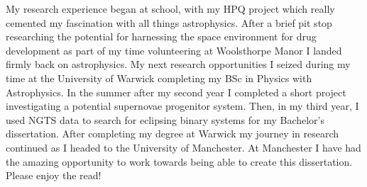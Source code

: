 \documentclass[
11pt, %
english, %
onehalfspacing, %
toctotoc, %
headsepline, %
twoside,
]{MastersDoctoralThesis} %
\newcommand{\changeurlcolor}[1]{\hypersetup{urlcolor=#1}}
\begin{document}




\begin{prefacestatement}

\addchaptertocentry{\prefacename} %

My research experience began at school, with my HPQ project which really cemented my fascination with all things astrophysics. After a brief pit stop researching the potential for harnessing the space environment for drug development as part of my time volunteering at Woolsthorpe Manor I landed firmly back on astrophysics. My next research opportunities I seized during my time at the University of Warwick completing my BSc in Physics with Astrophysics. In the summer after my second year I completed a short project investigating a potential supernovae progenitor system. Then, in my third year, I used NGTS data to search for eclipsing binary systems for my Bachelor's dissertation. After completing my degree at Warwick my journey in research continued as I headed to the University of Manchester. At Manchester I have had the amazing opportunity to work towards being able to create this dissertation. Please enjoy the read!

\end{prefacestatement}



\pagestyle{thesis} %

\end{document}

